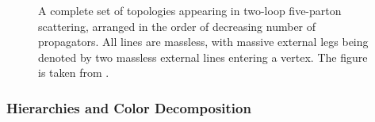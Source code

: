 \begin{figure}[ht]
\begin{center}
  \end{center}
  \caption{A complete set of topologies appearing in two-loop five-parton scattering, arranged
    in the order of decreasing number of propagators.
    All lines are massless, with massive external legs being denoted by two massless external lines entering a vertex.
    The figure is taken from \cite{Abreu:2017hqn}.
  }
  \label{fig:PropagatorStructures}
\end{figure}

\subsubsection{Hierarchies and Color Decomposition}

